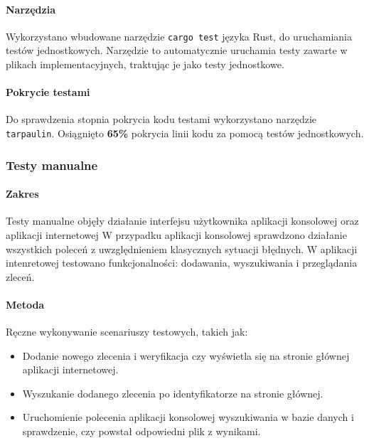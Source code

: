             \paragraph{Narzędzia}  
            Wykorzystano wbudowane narzędzie \texttt{cargo test} języka Rust, do uruchamiania testów jednostkowych. Narzędzie to automatycznie uruchamia testy zawarte w plikach implementacyjnych, traktując je jako testy jednostkowe.

            \paragraph{Pokrycie testami}
            Do sprawdzenia stopnia pokrycia kodu testami wykorzystano narzędzie \texttt{tarpaulin}\cite{Rust:tarpaulin}. 
            Osiągnięto \textbf{65\%} pokrycia linii kodu za pomocą testów jednostkowych.

        \subsubsection{Testy manualne}
        
            \paragraph{Zakres}
            Testy manualne objęły działanie interfejsu użytkownika aplikacji konsolowej oraz aplikacji internetowej W przypadku aplikacji konsolowej sprawdzono działanie wszystkich poleceń z uwzględnieniem klasycznych sytuacji błędnych. W aplikacji intenretowej testowano funkcjonalności: dodawania, wyszukiwania i przeglądania zleceń.

            \paragraph{Metoda}
            Ręczne wykonywanie scenariuszy testowych, takich jak:
            \begin{itemize}
                \item {Dodanie nowego zlecenia i weryfikacja czy wyświetla się na stronie głównej aplikacji internetowej.}
                \item {Wyszukanie dodanego zlecenia po identyfikatorze na stronie głównej.}
                \item {Uruchomienie polecenia aplikacji konsolowej wyszukiwania w bazie danych i sprawdzenie, czy powstał odpowiedni plik z wynikami.}
            \end{itemize}
